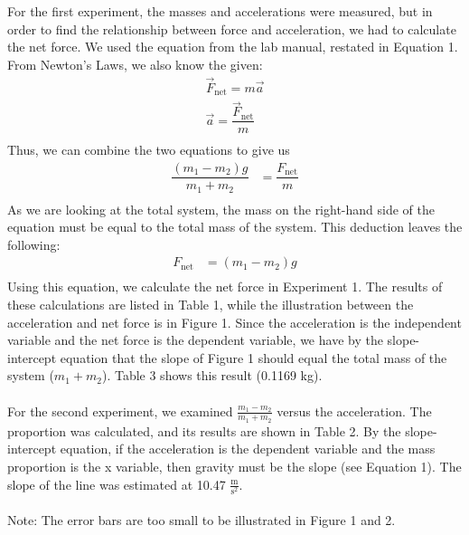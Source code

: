 \documentclass [12pt, letterpaper, twoside] {article}
\begin{document}
For the first experiment, the masses and accelerations were measured, but in order to find the relationship between force and acceleration, we had to calculate the net force. We used the equation from the lab manual, restated in Equation 1.
From Newton's Laws, we also know the given:
\begin {equation*}
  \begin {split}
    \vec{F}_{\text{net}} = m\vec{a} \\
    \vec{a} = \dfrac{\vec{F}_{\text{net}}}{m} \\
  \end {split}
\end {equation*}
Thus, we can combine the two equations to give us
\begin {equation*}
  \begin {split}
    \dfrac{(m_{1}-m_{2})g}{m_{1}+m_{2}} & = \dfrac{F_{\text{net}}}{m} \\
  \end {split}
\end {equation*}
As we are looking at the total system, the mass on the right-hand side of the equation must be equal to the total mass of the system. This deduction leaves the following:
\begin {equation}
  \begin {split}
    F_{\text{net}} & = (m_{1}-m_{2})g \\
  \end {split}
\end {equation}
Using this equation, we calculate the net force in Experiment 1. The results of these calculations are listed in Table 1, while the illustration between the acceleration and net force is in Figure 1. Since the acceleration is the independent variable and the net force is the dependent variable, we have by the slope-intercept equation that the slope of Figure 1 should equal the total mass of the system (\(m_{1}+m_{2}\)). Table 3 shows this result (0.1169 kg). \\\\
For the second experiment, we examined \(\tfrac{m_{1}-m_{2}}{m_{1}+m_{2}}\) versus the acceleration. The proportion was calculated, and its results are shown in Table 2. By the slope-intercept equation, if the acceleration is the dependent variable and the mass proportion is the x variable, then gravity must be the slope (see Equation 1). The slope of the line was estimated at 10.47 \(\tfrac{\text{m}}{\text{s}^2}\). \\\\
Note: The error bars are too small to be illustrated in Figure 1 and 2.
\end{document}
